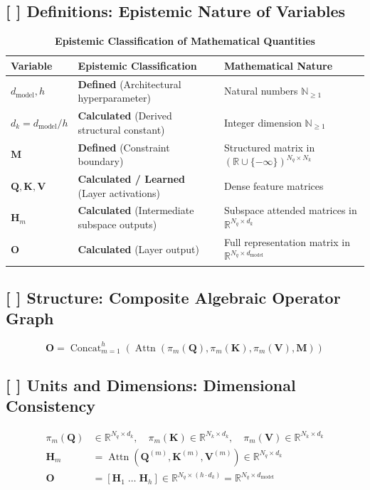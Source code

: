 \documentclass[11pt,a4paper]{article}
\theoremstyle{definition}
\begin{document}
\subsection{[ ] Definitions: Epistemic Nature of Variables}
\begin{table}[h]
\centering
\caption{\textbf{Epistemic Classification of Mathematical Quantities}}
\begin{tabular}{lll}
\toprule
\textbf{Variable} & \textbf{Epistemic Classification} & \textbf{Mathematical Nature} \\
\midrule
$d_{\text{model}}, h$ & \textbf{Defined} (Architectural hyperparameter) & Natural numbers $\mathbb{N}_{\ge 1}$ \\
$d_k = d_{\text{model}} / h$ & \textbf{Calculated} (Derived structural constant) & Integer dimension $\mathbb{N}_{\ge 1}$ \\
$\mathbf{M}$ & \textbf{Defined} (Constraint boundary) & Structured matrix in $(\mathbb{R} \cup \{-\infty\})^{N_q \times N_k}$ \\
$\mathbf{Q}, \mathbf{K}, \mathbf{V}$ & \textbf{Calculated / Learned} (Layer activations) & Dense feature matrices \\
$\mathbf{H}_m$ & \textbf{Calculated} (Intermediate subspace outputs) & Subspace attended matrices in $\mathbb{R}^{N_q \times d_k}$ \\
$\mathbf{O}$ & \textbf{Calculated} (Layer output) & Full representation matrix in $\mathbb{R}^{N_q \times d_{\text{model}}}$ \\
\bottomrule
\end{tabular}
\end{table}

\subsection{[ ] Structure: Composite Algebraic Operator Graph}
{\boldmath
\begin{equation}
\mathbf{O} = \operatorname{Concat}_{m=1}^h \left( \operatorname{Attn}\left(\pi_m(\mathbf{Q}), \pi_m(\mathbf{K}), \pi_m(\mathbf{V}), \mathbf{M}\right) \right)
\end{equation}
}

\subsection{[ ] Units and Dimensions: Dimensional Consistency}
{\boldmath
\begin{align}
\pi_m(\mathbf{Q}) &\in \mathbb{R}^{N_q \times d_k}, \quad \pi_m(\mathbf{K}) \in \mathbb{R}^{N_k \times d_k}, \quad \pi_m(\mathbf{V}) \in \mathbb{R}^{N_k \times d_k} \\
\mathbf{H}_m &= \operatorname{Attn}(\mathbf{Q}^{(m)}, \mathbf{K}^{(m)}, \mathbf{V}^{(m)}) \in \mathbb{R}^{N_q \times d_k} \\
\mathbf{O} &= [\mathbf{H}_1 \; \dots \; \mathbf{H}_h] \in \mathbb{R}^{N_q \times (h \cdot d_k)} = \mathbb{R}^{N_q \times d_{\text{model}}}
\end{align}
}
\end{document}

